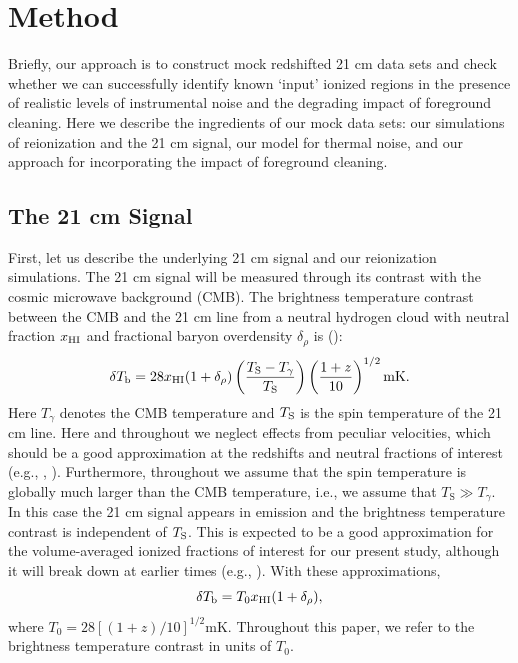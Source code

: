 \section{Method} \label{sec:method}
 
Briefly, our approach is to construct mock redshifted 21 cm data sets and check whether we
can successfully identify known `input' 
ionized regions in the presence of realistic levels of instrumental noise and the degrading impact
of foreground cleaning. Here we describe the ingredients of our mock data sets: our
simulations of reionization and the 21 cm signal, our model for thermal noise, and
our approach for incorporating the impact of foreground cleaning. 


\subsection{The 21 cm Signal} \label{sec:21cm}

First, let us describe the underlying 21 cm signal and our reionization simulations.
The 21 cm signal will be measured through its contrast with the cosmic microwave background (CMB). The brightness temperature contrast
between the CMB and the 21 cm line from a neutral hydrogen cloud with neutral fraction $x_{\text{HI}}$ and fractional baryon overdensity
$\delta_\rho$ is (\citealt{Zaldarriaga:2003du}):
\begin{equation}
\delta T_{\text{b}} = 28 x_{\text{HI}} (1 + \delta_{\rho})\left( \frac{T_{\text{S}} - T_{\gamma}}{T_{\text{S}}} \right) \left( \frac{1 + z}{10} \right)^{1/2}\text{mK}.
\end{equation}
Here $T_\gamma$ denotes the CMB temperature and $T_{\rm S}$ is the spin temperature of the 21 cm line. Here and throughout
we neglect effects from peculiar velocities, which should be a good approximation at the redshifts and neutral fractions
of interest (e.g., \citealt{Mesinger:2007pd}, \citealt{Mao:2011xp}). Furthermore, throughout we assume that the spin temperature is globally much larger than
the CMB temperature, i.e., we assume that
$T_{\text{S}} \gg T_{\gamma}$. In this case the 21 cm signal appears in emission and the brightness temperature contrast
is independent of $T_{\rm S}$. This is expected to be a good approximation for the volume-averaged ionized fractions of interest for our
present study, although it will break down at earlier times (e.g., \citealt{Ciardi:2003hg}). With these approximations, 
\begin{equation}
\delta T_{\text{b}} = T_{0} x_{\text{HI}} (1 + \delta_{\rho}), \label{eq:21cm}
\end{equation}
 where $T_{0} = 28\left[ (1+z)/10 \right]^{1/2}$mK. Throughout this paper, we refer to the brightness temperature contrast 
in units of $T_{0}$.

